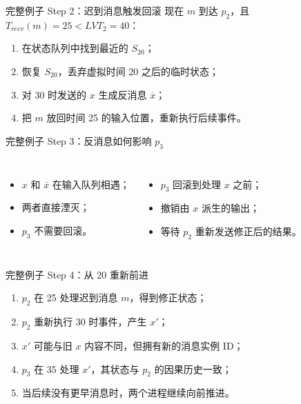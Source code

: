 \documentclass[UTF8,fontset=none,aspectratio=169,10pt]{beamer}
\begin{document}
\begin{frame}{完整例子 Step 2：迟到消息触发回滚}
现在 $m$ 到达 $p_2$，且 $T_{recv}(m)=25<LVT_2=40$：
\begin{enumerate}
  \item 在状态队列中找到最近的 $S_{20}$；
  \item 恢复 $S_{20}$，丢弃虚拟时间 20 之后的临时状态；
  \item 对 30 时发送的 $x$ 生成反消息 $\overline{x}$；
  \item 把 $m$ 放回时间 25 的输入位置，重新执行后续事件。
\end{enumerate}
\vfill
{}
\end{frame}

\begin{frame}{完整例子 Step 3：反消息如何影响 $p_3$}
\begin{columns}[T,onlytextwidth]
\begin{itemize}
  \item $x$ 和 $\overline{x}$ 在输入队列相遇；
  \item 两者直接湮灭；
  \item $p_3$ 不需要回滚。
\end{itemize}
\begin{itemize}
  \item $p_3$ 回滚到处理 $x$ 之前；
  \item 撤销由 $x$ 派生的输出；
  \item 等待 $p_2$ 重新发送修正后的结果。
\end{itemize}
\end{columns}
\vfill
{}
\end{frame}

\begin{frame}{完整例子 Step 4：从 20 重新前进}
\begin{enumerate}
  \item $p_2$ 在 25 处理迟到消息 $m$，得到修正状态；
  \item $p_2$ 重新执行 30 时事件，产生 $x'$；
  \item $x'$ 可能与旧 $x$ 内容不同，但拥有新的消息实例 ID；
  \item $p_3$ 在 35 处理 $x'$，其状态与 $p_2$ 的因果历史一致；
  \item 当后续没有更早消息时，两个进程继续向前推进。
\end{enumerate}
\vfill
{}
\end{frame}
\end{document}

